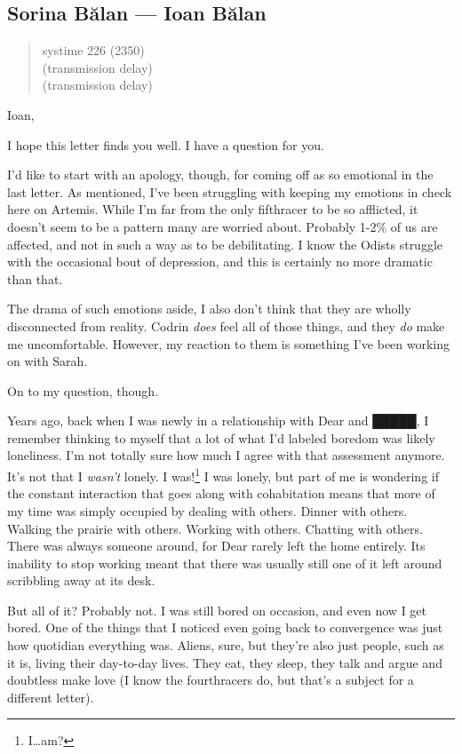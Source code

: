 \hypertarget{sorina-bux103lan-ioan-bux103lan}{%
\subsection{Sorina Bălan — Ioan Bălan}\label{sorina-bux103lan-ioan-bux103lan}}

\begin{quote}
systime 226 (2350)\\
(transmission delay)\\
(transmission delay)
\end{quote}

Ioan,

I hope this letter finds you well. I have a question for you.

I'd like to start with an apology, though, for coming off as so emotional in the last letter. As mentioned, I've been struggling with keeping my emotions in check here on Artemis. While I'm far from the only fifthracer to be so afflicted, it doesn't seem to be a pattern many are worried about. Probably 1-2\% of us are affected, and not in such a way as to be debilitating. I know the Odists struggle with the occasional bout of depression, and this is certainly no more dramatic than that.

The drama of such emotions aside, I also don't think that they are wholly disconnected from reality. Codrin \emph{does} feel all of those things, and they \emph{do} make me uncomfortable. However, my reaction to them is something I've been working on with Sarah.

On to my question, though.

Years ago, back when I was newly in a relationship with Dear and █████, I remember thinking to myself that a lot of what I'd labeled boredom was likely loneliness. I'm not totally sure how much I agree with that assessment anymore. It's not that I \emph{wasn't} lonely. I was!\footnote{I\ldots am?} I was lonely, but part of me is wondering if the constant interaction that goes along with cohabitation means that more of my time was simply occupied by dealing with others. Dinner with others. Walking the prairie with others. Working with others. Chatting with others. There was always someone around, for Dear rarely left the home entirely. Its inability to stop working meant that there was usually still one of it left around scribbling away at its desk.

But all of it? Probably not. I was still bored on occasion, and even now I get bored. One of the things that I noticed even going back to convergence was just how quotidian everything was. Aliens, sure, but they're also just people, such as it is, living their day-to-day lives. They eat, they sleep, they talk and argue and doubtless make love (I know the fourthracers do, but that's a subject for a different letter).

